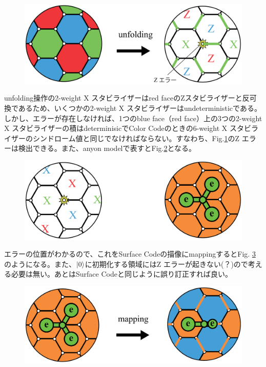 \documentclass[a4paper,9pt]{ltjsarticle}
\begin{document}
{    \begin{figure}[h]
        \centering
        \includegraphics[scale=0.18]{figure/figure5.eps}
        \vspace{-20pt}\caption{ }
        \label{figure5}
    \end{figure}
    unfolding操作の2-weight X スタビライザーはred faceのZスタビライザーと反可換であるため、いくつかの2-weight X スタビライザーはundeterministicである。しかし、エラーが存在しなければ、1つのblue face（red face）上の3つの2-weight X スタビライザーの積はdeterminisicでColor Codeのときの6-weight X スタビライザーのシンドローム値と同じでなければならない。すなわち、Fig.\ref{figure5}のZ エラーは検出できる。また、anyon modelで表すとFig.\ref{figure6}となる。


    \begin{figure}[h]
        \centering
        \includegraphics[scale=0.18]{figure/figure6.eps}
        \vspace{-20pt}\caption{ }
        \label{figure6}
    \end{figure}

    エラーの位置がわかるので、これをSurface Codeの描像にmappingするとFig. \ref{figure7}のようになる。また、$\ket{0}$に初期化する領域にはZ エラーが起きない(？)ので考える必要は無い。あとはSurface Codeと同じように誤り訂正すれば良い。

    \begin{figure}[h]
        \centering
        \includegraphics[scale=0.18]{figure/figure7.eps}
        \vspace{-20pt}\caption{ }
        \label{figure7}
    \end{figure}
}
\clearpage
\end{document}
